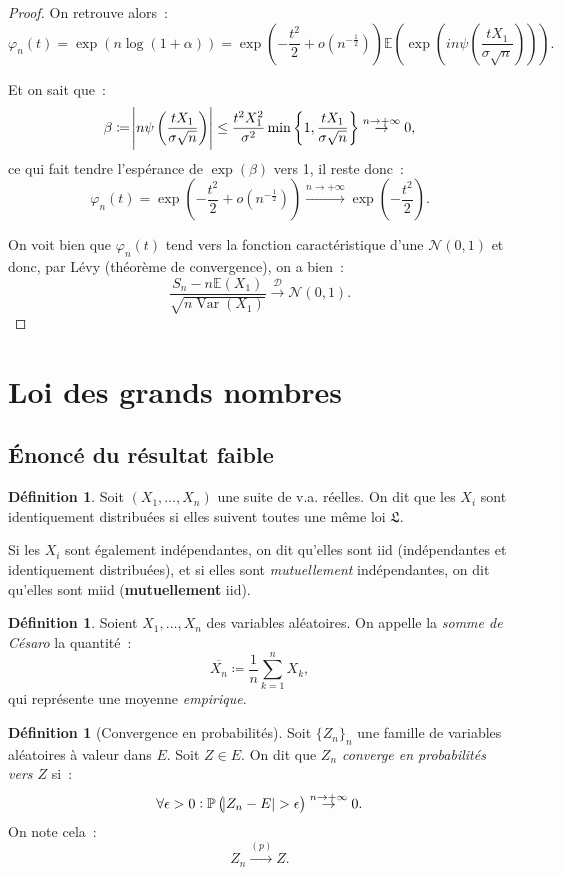\documentclass{article}
\newcommand{\E}{\mathbb E}
\renewcommand{\P}{\mathbb P}
\newcommand{\Nzu}{\mathcal N(0, 1)}  %
\newcommand{\convl}{\stackrel{\mathcal D}\to}  %
\newcommand{\Ces}{\overline}  %
\newcommand{\convp}{\stackrel {(p)}\to}  %
\DeclareMathOperator{\Var}{Var}
\theoremstyle{definition}
\newtheorem{déf}[thm]{Définition}
\theoremstyle{remark}
\begin{document}
\begin{proof}
		On retrouve alors~:
		\[\varphi_n(t) = \exp(n\log(1 + \alpha)) = \exp\left(-\frac {t^2}2 + o(n^{-\frac 12})\right)\E\left(\exp\left(in\psi\left(\frac {tX_1}{\sigma \sqrt n}\right)\right)\right).\]

		Et on sait que~:
		\[\beta \coloneqq \abs{n\psi\left(\frac {tX_1}{\sigma\sqrt n}\right)} \leq \frac {t^2X_1^2}{\sigma^2}\min\left\{1, \frac {tX_1}{\sigma\sqrt n}\right\}
			\stackrel {n \to +\infty}\to 0,\]
		ce qui fait tendre l'espérance de $\exp(\beta)$ vers 1, il reste donc~:
		\[\varphi_n(t) = \exp\left(-\frac {t^2}2 + o(n^{-\frac 12})\right) \stackrel {n \to +\infty}\to \exp\left(-\frac {t^2}2\right).\]

		On voit bien que $\varphi_n(t)$ tend vers la fonction caractéristique d'une $\Nzu$ et donc, par Lévy (théorème de convergence), on a bien~:
		\[\frac {S_n - n\E(X_1)}{\sqrt {n\Var(X_1)}} \convl \Nzu.\]
		\end{proof}

\newpage
\section{Loi des grands nombres}
	\subsection{Énoncé du résultat faible}
		\begin{déf} Soit $(X_1, \dotsc, X_n)$ une suite de v.a. réelles. On dit que les $X_i$ sont identiquement distribuées si elles suivent toutes une même
		loi $\mathfrak L$.

		Si les $X_i$ sont également indépendantes, on dit qu'elles sont iid (indépendantes et identiquement distribuées), et si elles sont \emph{mutuellement}
		indépendantes, on dit qu'elles sont miid (\textbf{mutuellement} iid).
		\end{déf}

		\begin{déf} Soient $X_1, \dotsc, X_n$ des variables aléatoires. On appelle la \emph{somme de Césaro} la quantité~:
		\[\Ces{X_n} \coloneqq \frac 1n \sum_{k=1}^nX_k,\]
		qui représente une moyenne \emph{empirique}.
		\end{déf}

		\begin{déf}[Convergence en probabilités] Soit $\{Z_n\}_n$ une famille de variables aléatoires à valeur dans $E$. Soit $Z \in E$. On dit que \emph{$Z_n$
		converge en probabilités vers $Z$} si~:
		\[\forall \epsilon > 0 : \P\left(\abs {Z_n - E} > \epsilon\right) \stackrel {n \to +\infty}\to 0.\]
		On note cela~:
		\[Z_n \convp Z.\]
		\end{déf}
\end{document}
